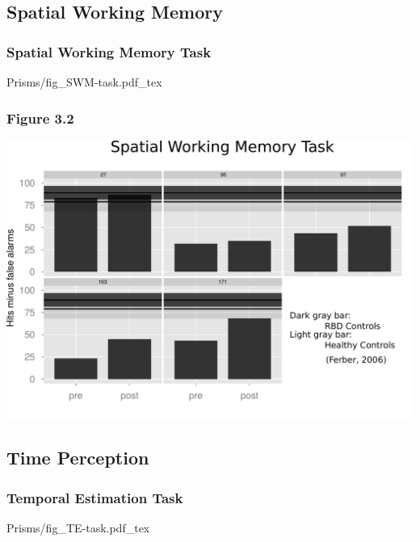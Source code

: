 \documentclass{beamer}
\begin{document}
\subsection*{Spatial Working Memory}

\begin{frame}
	\frametitle{Spatial Working Memory Task}
	\def\svgwidth{0.7\textwidth}
	{Prisms/fig_SWM-task.pdf_tex}
\end{frame}



\subsection*{Time Perception}
\begin{frame}
	\frametitle{Temporal Estimation Task}
	\def\svgwidth{0.9\textwidth}
	{Prisms/fig_TE-task.pdf_tex}
\end{frame}
\end{document}
